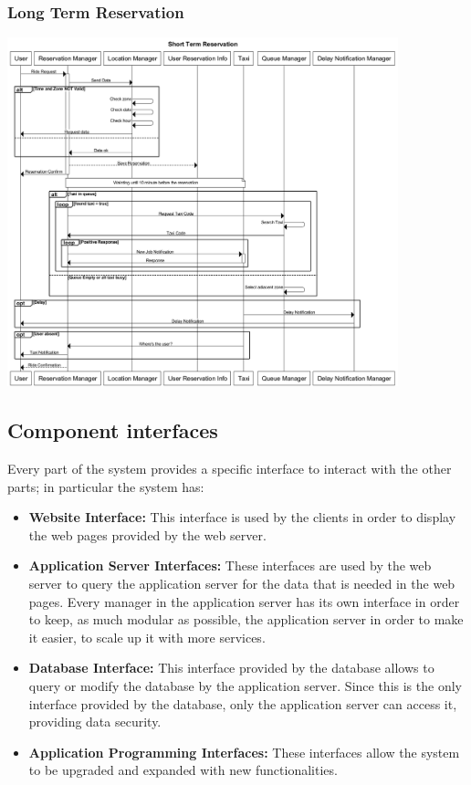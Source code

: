 	\subsubsection{Long Term Reservation}
		\begin{center}
			\includegraphics[width=0.85\textwidth]{./images/Long_Term_Reservation_Complete.png}
		\end{center}
\subsection{Component interfaces}
	Every part of the system provides a specific interface to interact with the other parts; in particular the system has:
	\begin{itemize}
		\item \textbf{Website Interface:} This interface is used by the clients in order to display the web pages provided by the web server.
		\item \textbf{Application Server Interfaces:} These interfaces are used by the web server to query the application server for the data that is needed in the web pages. Every manager in the application server has its own interface in order to keep, as much modular as possible, the application server in order to make it easier, to scale up it with more services.
		\item \textbf{Database Interface:} This interface provided by the database allows to query or modify the database by the application server. Since this is the only interface provided by the database, only the application server can access it, providing data security.
		\item \textbf{Application Programming Interfaces:} These interfaces allow the system to be upgraded and expanded with new functionalities.
	\end{itemize}
